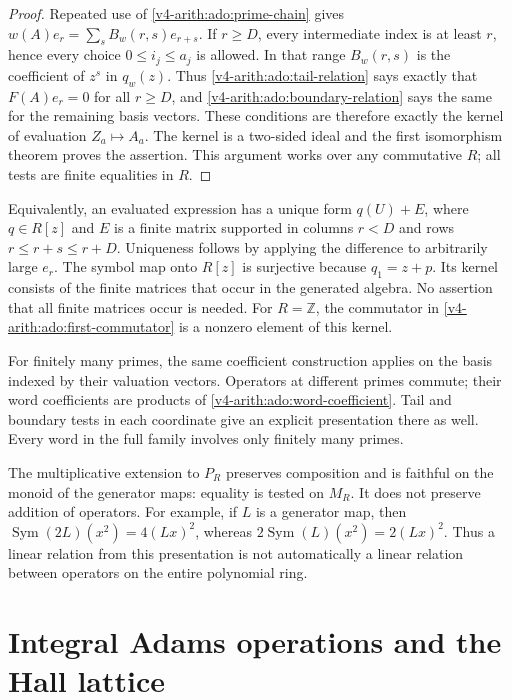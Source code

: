 \begin{proof}
Repeated use of \eqref{v4-arith:ado:prime-chain} gives
\(w(A)e_r=\sum_sB_w(r,s)e_{r+s}\). If \(r\ge D\), every intermediate
index is at least \(r\), hence every choice \(0\le i_j\le a_j\) is
allowed. In that range \(B_w(r,s)\) is the coefficient of \(z^s\) in
\(q_w(z)\). Thus \eqref{v4-arith:ado:tail-relation} says exactly that
\(F(A)e_r=0\) for all \(r\ge D\), and
\eqref{v4-arith:ado:boundary-relation} says the same for the remaining
basis vectors. These conditions are therefore exactly the kernel of
evaluation \(Z_a\mapsto A_a\). The kernel is a two-sided ideal and the
first isomorphism theorem proves the assertion. This argument works over
any commutative \(R\); all tests are finite equalities in \(R\).
\end{proof}

Equivalently, an evaluated expression has a unique form
\(q(U)+E\), where \(q\in R[z]\) and \(E\) is a finite matrix supported
in columns \(r<D\) and rows \(r\le r+s\le r+D\). Uniqueness follows
by applying the difference to arbitrarily large \(e_r\).
The symbol map onto \(R[z]\) is surjective because \(q_1=z+p\).
Its kernel consists of the finite matrices that occur in the generated
algebra. No assertion that all finite matrices occur is needed.
For \(R=\mathbb Z\), the commutator in
\eqref{v4-arith:ado:first-commutator} is a nonzero element of this kernel.

For finitely many primes, the same coefficient construction applies on
the basis indexed by their valuation vectors. Operators at different
primes commute; their word coefficients are products of
\eqref{v4-arith:ado:word-coefficient}. Tail and boundary tests in each
coordinate give an explicit presentation there as well. Every word in
the full family involves only finitely many primes.

The multiplicative extension to \(P_R\) preserves composition and is
faithful on the monoid of the generator maps: equality is tested on
\(M_R\). It does not preserve addition of operators. For example, if
\(L\) is a generator map, then
\(\operatorname{Sym}(2L)(x^2)=4(Lx)^2\), whereas
\(2\operatorname{Sym}(L)(x^2)=2(Lx)^2\).
Thus a linear relation from this presentation is not automatically a
linear relation between operators on the entire polynomial ring.

\section{Integral Adams operations and the Hall lattice}
\label{v4-arith:ado:integral-adams}
\label{v4-arith:gb:wilkerson-fails}

